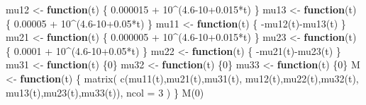 \documentclass[a4paper,12pt,openany]{book}
\newenvironment{Shaded}{\begin{snugshade}}{\end{snugshade}}
\newcommand{\AttributeTok}[1]{\textcolor[rgb]{0.77,0.63,0.00}{#1}}
\newcommand{\ControlFlowTok}[1]{\textcolor[rgb]{0.13,0.29,0.53}{\textbf{#1}}}
\newcommand{\DecValTok}[1]{\textcolor[rgb]{0.00,0.00,0.81}{#1}}
\newcommand{\FloatTok}[1]{\textcolor[rgb]{0.00,0.00,0.81}{#1}}
\newcommand{\FunctionTok}[1]{\textcolor[rgb]{0.00,0.00,0.00}{#1}}
\newcommand{\NormalTok}[1]{#1}
\newcommand{\OtherTok}[1]{\textcolor[rgb]{0.56,0.35,0.01}{#1}}
\newcommand{\SpecialCharTok}[1]{\textcolor[rgb]{0.00,0.00,0.00}{#1}}
\begin{document}
\begin{Shaded}
\begin{Highlighting}[]
\NormalTok{mu12 }\OtherTok{\textless{}{-}} \ControlFlowTok{function}\NormalTok{(t) \{}
  \FloatTok{0.000015} \SpecialCharTok{+} \DecValTok{10}\SpecialCharTok{\^{}}\NormalTok{(}\FloatTok{4.6}\DecValTok{{-}10}\FloatTok{+0.015}\SpecialCharTok{*}\NormalTok{t)}
\NormalTok{\}}
\NormalTok{mu13 }\OtherTok{\textless{}{-}} \ControlFlowTok{function}\NormalTok{(t) \{}
  \FloatTok{0.00005} \SpecialCharTok{+} \DecValTok{10}\SpecialCharTok{\^{}}\NormalTok{(}\FloatTok{4.6}\DecValTok{{-}10}\FloatTok{+0.05}\SpecialCharTok{*}\NormalTok{t)}
\NormalTok{\}}
\NormalTok{mu11 }\OtherTok{\textless{}{-}} \ControlFlowTok{function}\NormalTok{(t) \{}
  \SpecialCharTok{{-}}\FunctionTok{mu12}\NormalTok{(t)}\SpecialCharTok{{-}}\FunctionTok{mu13}\NormalTok{(t)}
\NormalTok{\}}
\NormalTok{mu21 }\OtherTok{\textless{}{-}} \ControlFlowTok{function}\NormalTok{(t) \{}
  \FloatTok{0.000005} \SpecialCharTok{+} \DecValTok{10}\SpecialCharTok{\^{}}\NormalTok{(}\FloatTok{4.6}\DecValTok{{-}10}\FloatTok{+0.015}\SpecialCharTok{*}\NormalTok{t)}
\NormalTok{\}}
\NormalTok{mu23 }\OtherTok{\textless{}{-}} \ControlFlowTok{function}\NormalTok{(t) \{}
  \FloatTok{0.0001} \SpecialCharTok{+} \DecValTok{10}\SpecialCharTok{\^{}}\NormalTok{(}\FloatTok{4.6}\DecValTok{{-}10}\FloatTok{+0.05}\SpecialCharTok{*}\NormalTok{t)}
\NormalTok{\}}
\NormalTok{mu22 }\OtherTok{\textless{}{-}} \ControlFlowTok{function}\NormalTok{(t) \{}
  \SpecialCharTok{{-}}\FunctionTok{mu21}\NormalTok{(t)}\SpecialCharTok{{-}}\FunctionTok{mu23}\NormalTok{(t)}
\NormalTok{\}}
\NormalTok{mu31 }\OtherTok{\textless{}{-}} \ControlFlowTok{function}\NormalTok{(t) \{}\DecValTok{0}\NormalTok{\}}
\NormalTok{mu32 }\OtherTok{\textless{}{-}} \ControlFlowTok{function}\NormalTok{(t) \{}\DecValTok{0}\NormalTok{\}}
\NormalTok{mu33 }\OtherTok{\textless{}{-}} \ControlFlowTok{function}\NormalTok{(t) \{}\DecValTok{0}\NormalTok{\}}
\NormalTok{M }\OtherTok{\textless{}{-}} \ControlFlowTok{function}\NormalTok{(t) \{}
  \FunctionTok{matrix}\NormalTok{(}
    \FunctionTok{c}\NormalTok{(}\FunctionTok{mu11}\NormalTok{(t),}\FunctionTok{mu21}\NormalTok{(t),}\FunctionTok{mu31}\NormalTok{(t),}
      \FunctionTok{mu12}\NormalTok{(t),}\FunctionTok{mu22}\NormalTok{(t),}\FunctionTok{mu32}\NormalTok{(t),}
      \FunctionTok{mu13}\NormalTok{(t),}\FunctionTok{mu23}\NormalTok{(t),}\FunctionTok{mu33}\NormalTok{(t)),}
    \AttributeTok{ncol =} \DecValTok{3}
\NormalTok{  )}
\NormalTok{\}}
\FunctionTok{M}\NormalTok{(}\DecValTok{0}\NormalTok{)}
\end{Highlighting}
\end{Shaded}
\end{document}
